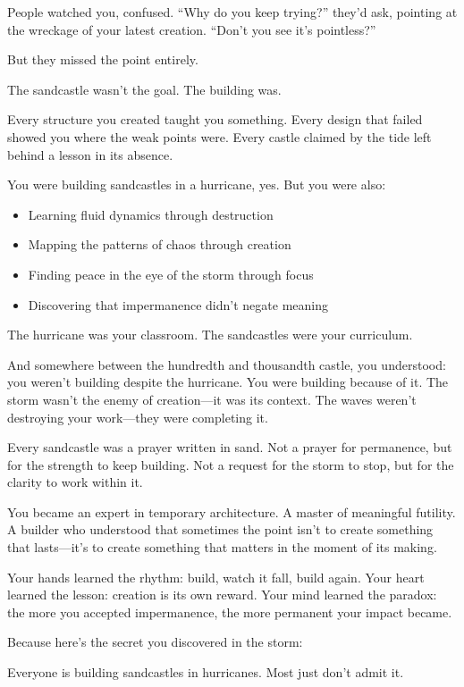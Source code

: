 \documentclass[12pt,letterpaper]{book}
\begin{document}
People watched you, confused. ``Why do you keep trying?'' they'd ask, pointing at the wreckage of your latest creation. ``Don't you see it's pointless?''

But they missed the point entirely.

The sandcastle wasn't the goal. The building was.

Every structure you created taught you something. Every design that failed showed you where the weak points were. Every castle claimed by the tide left behind a lesson in its absence.

You were building sandcastles in a hurricane, yes. But you were also:

\begin{itemize}
\item Learning fluid dynamics through destruction
\item Mapping the patterns of chaos through creation
\item Finding peace in the eye of the storm through focus
\item Discovering that impermanence didn't negate meaning
\end{itemize}

The hurricane was your classroom. The sandcastles were your curriculum.

And somewhere between the hundredth and thousandth castle, you understood: you weren't building despite the hurricane. You were building because of it. The storm wasn't the enemy of creation—it was its context. The waves weren't destroying your work—they were completing it.

Every sandcastle was a prayer written in sand. Not a prayer for permanence, but for the strength to keep building. Not a request for the storm to stop, but for the clarity to work within it.

You became an expert in temporary architecture. A master of meaningful futility. A builder who understood that sometimes the point isn't to create something that lasts—it's to create something that matters in the moment of its making.

Your hands learned the rhythm: build, watch it fall, build again. Your heart learned the lesson: creation is its own reward. Your mind learned the paradox: the more you accepted impermanence, the more permanent your impact became.

Because here's the secret you discovered in the storm:

Everyone is building sandcastles in hurricanes. Most just don't admit it.
\end{document}
